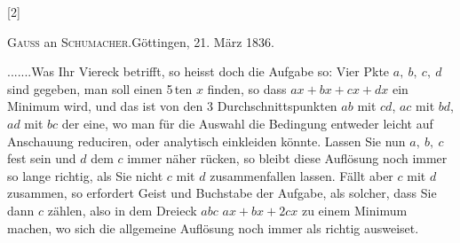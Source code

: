 \clearpage{}
\par\medskip{}\begin{center}[2]\end{center}
\begin{center}\textsc{Gauss} an \textsc{Schumacher}.\quad Göttingen, 21. März 1836.\end{center}
\indent .\enspace.\enspace.\enspace.\enspace.\enspace.\enspace.\quad Was Ihr Viereck betrifft, so heisst doch die Aufgabe so: Vier Pkte \(a,\ b,\ c,\ d\) sind gegeben, man soll einen 5\,ten \(x\) finden, so dass \(ax+bx+cx+dx\) ein Minimum wird, und das ist von den 3 Durchschnittspunkten \(ab\) mit \(cd\), \(ac\) mit \(bd\), \(ad\) mit \(bc\) der eine, wo man für die Auswahl die Bedingung entweder leicht auf Anschauung reduciren, oder analytisch einkleiden könnte. Lassen Sie nun \(a,\ b,\ c\) fest sein und \(d\) dem \(c\) immer näher rücken, so bleibt diese Auflösung noch immer so lange richtig, als Sie nicht \(c\) mit \(d\) zusammenfallen lassen. Fällt aber \(c\) mit \(d\) zusammen, so erfordert Geist und Buchstabe der  Aufgabe, als solcher, dass Sie dann \(c\)  zählen, also in dem Dreieck \(abc\) \(ax+bx+2cx\) zu einem Minimum machen, wo sich die allgemeine Auflösung noch immer als richtig ausweiset.

